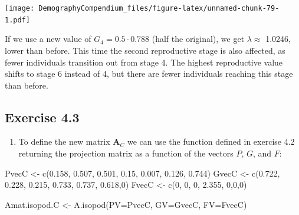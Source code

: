 \documentclass[
]{book}
\newenvironment{Shaded}{\begin{snugshade}}{\end{snugshade}}
\newcommand{\AttributeTok}[1]{\textcolor[rgb]{0.77,0.63,0.00}{#1}}
\newcommand{\DecValTok}[1]{\textcolor[rgb]{0.00,0.00,0.81}{#1}}
\newcommand{\FloatTok}[1]{\textcolor[rgb]{0.00,0.00,0.81}{#1}}
\newcommand{\FunctionTok}[1]{\textcolor[rgb]{0.00,0.00,0.00}{#1}}
\newcommand{\NormalTok}[1]{#1}
\newcommand{\OtherTok}[1]{\textcolor[rgb]{0.56,0.35,0.01}{#1}}
\providecommand{\tightlist}{%
  \setlength{\itemsep}{0pt}\setlength{\parskip}{0pt}}
\begin{document}
\texttt{[image: DemographyCompendium\_files/figure-latex/unnamed-chunk-79-1.pdf]}

If we use a new value of \(G_4=0.5\cdot 0.788\) (half the original), we get \(\lambda\approx\) 1.0246, lower than before. This time the second reproductive stage is also affected, as fewer individuals transition out from stage 4. The highest reproductive value shifts to stage 6 instead of 4, but there are fewer individuals reaching this stage than before.

\hypertarget{exercise-4.3-1}{%
\subsection*{Exercise 4.3}\label{exercise-4.3-1}}

\begin{enumerate}
\def\labelenumi{\arabic{enumi}.}
\tightlist
\item
  To define the new matrix \(\mathbf{A}_C\) we can use the function defined in exercise 4.2 returning the projection matrix as a function of the vectors \(P\), \(G\), and \(F\):
\end{enumerate}

\begin{Shaded}
\begin{Highlighting}[]
\NormalTok{PvecC }\OtherTok{\textless{}{-}} \FunctionTok{c}\NormalTok{(}\FloatTok{0.158}\NormalTok{, }\FloatTok{0.507}\NormalTok{, }\FloatTok{0.501}\NormalTok{, }\FloatTok{0.15}\NormalTok{, }\FloatTok{0.007}\NormalTok{, }\FloatTok{0.126}\NormalTok{, }\FloatTok{0.744}\NormalTok{)}
\NormalTok{GvecC }\OtherTok{\textless{}{-}} \FunctionTok{c}\NormalTok{(}\FloatTok{0.722}\NormalTok{, }\FloatTok{0.228}\NormalTok{, }\FloatTok{0.215}\NormalTok{, }\FloatTok{0.733}\NormalTok{, }\FloatTok{0.737}\NormalTok{, }\FloatTok{0.618}\NormalTok{,}\DecValTok{0}\NormalTok{)}
\NormalTok{FvecC }\OtherTok{\textless{}{-}} \FunctionTok{c}\NormalTok{(}\DecValTok{0}\NormalTok{, }\DecValTok{0}\NormalTok{, }\DecValTok{0}\NormalTok{, }\FloatTok{2.355}\NormalTok{, }\DecValTok{0}\NormalTok{,}\DecValTok{0}\NormalTok{,}\DecValTok{0}\NormalTok{)}
 
\NormalTok{Amat.isopod.C }\OtherTok{\textless{}{-}} \FunctionTok{A.isopod}\NormalTok{(}\AttributeTok{PV=}\NormalTok{PvecC, }\AttributeTok{GV=}\NormalTok{GvecC, }\AttributeTok{FV=}\NormalTok{FvecC)}
\end{Highlighting}
\end{Shaded}
\end{document}
